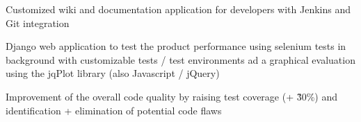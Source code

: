 \documentclass[10pt,A4]{article}
\newcommand{\cvlist}[1] {
	\begin{itemize}{#1}\end{itemize}
}
\begin{document}
\begin{paracol}{2}
\begin{rightcolumn}
{{			%
		}}
		{\cvlist{
			\item{Customized wiki and documentation application for developers with Jenkins and Git integration}%
			\item{Django web application to test the product performance using selenium tests in background with customizable tests / test environments ad a graphical evaluation using the jqPlot library (also Javascript / jQuery)}%
			\item{Improvement of the overall code quality by raising test coverage (+ \~30\%) and identification + elimination of potential code flaws}%
		}}


\end{rightcolumn}
\end{paracol}
\end{document}
